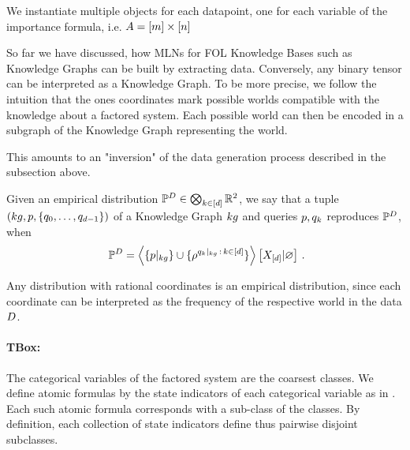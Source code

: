 
We instantiate multiple objects for each datapoint, one for each variable of the importance formula, i.e. $A=[m]\times[n]$




So far we have discussed, how MLNs for FOL Knowledge Bases such as Knowledge Graphs can be built by extracting data.
Conversely, any binary tensor can be interpreted as a Knowledge Graph.
To be more precise, we follow the intuition that the ones coordinates mark possible worlds compatible with the knowledge about a factored system.
Each possible world can then be encoded in a subgraph of the Knowledge Graph representing the world.

%
This amounts to an "inversion" of the data generation process described in the subsection above.

%


\begin{definition}
	Given an empirical distribution $\mathbb{P}^{D}\in\bigotimes_{k\in[d]}\mathbb{R}^2$, we say that a tuple $(kg,p,\{q_{0},\ldots,q_{d-1}\})$ of a Knowledge Graph $kg$ and queries $p,q_{k}$ reproduces $\mathbb{P}^{D}$, when
		\[ \empdistribution = \normationof{\{\kggroundingof{\impformula}\}\cup\{\rencodingof{\kggroundingof{\extformulaof{\atomenumerator}}\, : \, \atomenumeratorin}\}}{\shortcatvariables} \, .  \]
\end{definition}

%
Any distribution with rational coordinates is an empirical distribution, since each coordinate can be interpreted as the frequency of the respective world in the data $D$.



\paragraph{TBox:} The categorical variables of the factored system are the coarsest classes.
We define atomic formulas by the state indicators of each categorical variable as in .
Each such atomic formula corresponds with a sub-class of the classes.
By definition, each collection of state indicators define thus pairwise disjoint subclasses.

